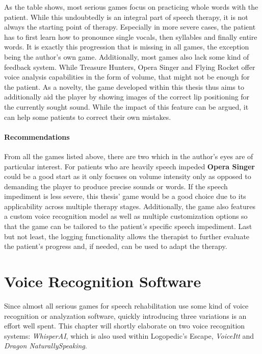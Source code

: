 \documentclass[draft,final]{vutinfth} %
\begin{document}
As the table shows, most serious games focus on practicing whole words with the patient. While this undoubtedly is an integral part of speech therapy, it is not always the starting point of therapy. Especially in more severe cases, the patient has to first learn how to pronounce single vocals, then syllables and finally entire words. It is exactly this progression that is missing in all games, the exception being the author's own game.
Additionally, most games also lack some kind of feedback system. While Treasure Hunters, Opera Singer and Flying Rocket offer voice analysis capabilities in the form of volume, that might not be enough for the patient. As a novelty, the game developed within this thesis thus aims to additionally aid the player by showing images of the correct lip positioning for the currently sought sound. While the impact of this feature can be argued, it can help some patients to correct their own mistakes.


\paragraph{Recommendations} 
From all the games listed above, there are two which in the author's eyes are of particular interest. For patients who are heavily speech impeded \textbf{Opera Singer} could be a good start as it only focuses on volume intensity only as opposed to demanding the player to produce precise sounds or words. If the speech impediment is less severe, this thesis' game would be a good choice due to its applicability across multiple therapy stages. Additionally, the game also features a custom voice recognition model as well as multiple customization options so that the game can be tailored to the patient's specific speech impediment. Last but not least, the logging functionality allows the therapist to further evaluate the patient's progress and, if needed, can be used to adapt the therapy.
\section{Voice Recognition Software}
Since almost all serious games for speech rehabilitation use some kind of voice recognition or analyzation software, quickly introducing three variations is an effort well spent. This chapter will shortly elaborate on two voice recognition systems: \emph{WhisperAI}, which is also used within Logopedic's Escape, \emph{VoiceItt} and \emph{Dragon NaturallySpeaking}.
\end{document}
